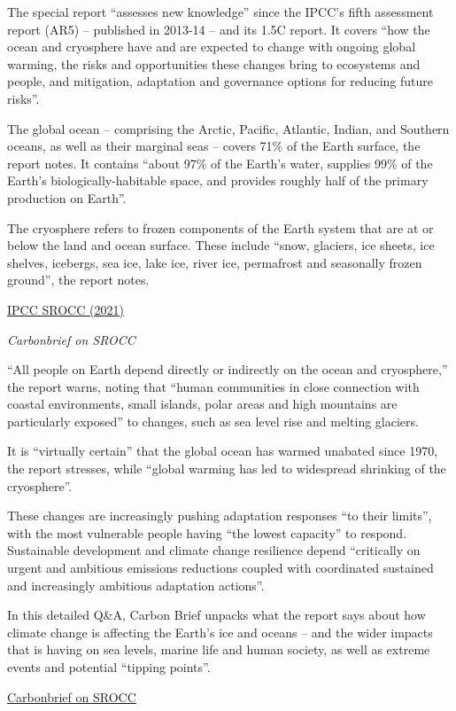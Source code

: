 \documentclass[
]{book}
\begin{document}
The special report ``assesses new knowledge'' since the IPCC's fifth assessment report (AR5) -- published in 2013-14 -- and its 1.5C report. It covers ``how the ocean and cryosphere have and are expected to change with ongoing global warming, the risks and opportunities these changes bring to ecosystems and people, and mitigation, adaptation and governance options for reducing future risks''.

The global ocean -- comprising the Arctic, Pacific, Atlantic, Indian, and Southern oceans, as well as their marginal seas -- covers 71\% of the Earth surface, the report notes. It contains ``about 97\% of the Earth's water, supplies 99\% of the Earth's biologically-habitable space, and provides roughly half of the primary production on Earth''.

The cryosphere refers to frozen components of the Earth system that are at or below the land and ocean surface. These include ``snow, glaciers, ice sheets, ice shelves, icebergs, sea ice, lake ice, river ice, permafrost and seasonally frozen ground'', the report notes.

\href{https://www.ipcc.ch/srocc/}{IPCC SROCC (2021)}

\emph{Carbonbrief on SROCC}

``All people on Earth depend directly or indirectly on the ocean and cryosphere,'' the report warns, noting that ``human communities in close connection with coastal environments, small islands, polar areas and high mountains are particularly exposed'' to changes, such as sea level rise and melting glaciers.

It is ``virtually certain'' that the global ocean has warmed unabated since 1970, the report stresses, while ``global warming has led to widespread shrinking of the cryosphere''.

These changes are increasingly pushing adaptation responses ``to their limits'', with the most vulnerable people having ``the lowest capacity'' to respond. Sustainable development and climate change resilience depend ``critically on urgent and ambitious emissions reductions coupled with coordinated sustained and increasingly ambitious adaptation actions''.

In this detailed Q\&A, Carbon Brief unpacks what the report says about how climate change is affecting the Earth's ice and oceans -- and the wider impacts that is having on sea levels, marine life and human society, as well as extreme events and potential ``tipping points''.

\href{https://www.carbonbrief.org/in-depth-qa-the-ipccs-special-report-on-the-ocean-and-cryosphere}{Carbonbrief on SROCC}
\end{document}
